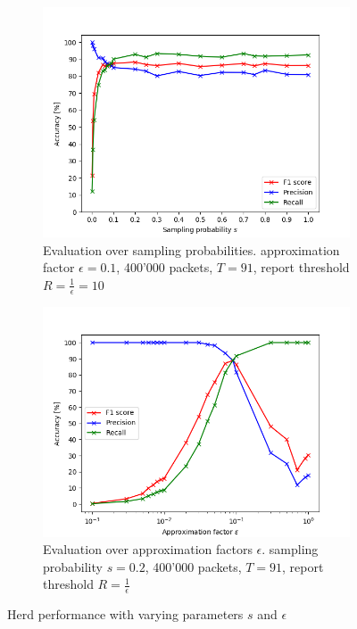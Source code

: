 \documentclass[11pt,oneside,a4paper]{article}
\begin{document}
\begin{figure}
	\centering
	\begin{subfigure}{.5\textwidth}
		\centering
		\includegraphics[width=\linewidth]{figures/sampl_prob_400k_e0_1_re}
		\caption{Evaluation over sampling probabilities. \newline
			approximation factor $\epsilon = 0.1$, 400'000 packets, \newline
			 $T = 91$, report threshold $R = \frac{1}{\epsilon} = 10$}
		\label{fig:sampling_prob_graph}
	\end{subfigure}%
	\begin{subfigure}{.5\textwidth}
		\centering
		\includegraphics[width=\linewidth]{figures/epsilon_400k_s0_2_re}
		\caption{Evaluation over approximation factors $\epsilon$. \newline
			sampling probability $s = 0.2$, 400'000 packets, \newline
			$T = 91$, report threshold $R = \frac{1}{\epsilon}$}
		\label{fig:epsilon_graph}
	\end{subfigure}
	\caption{Herd performance with varying parameters $s$ and $\epsilon$}
\end{figure}
\end{document}
